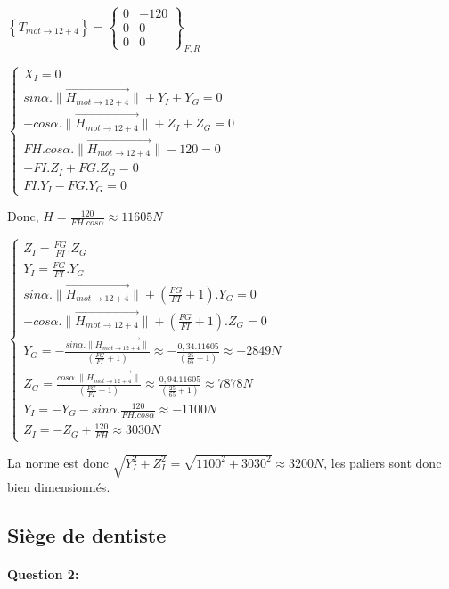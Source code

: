 $\left\{T_{mot\rightarrow 12+4}\right\}=\left\{
\begin{array}{cc}
0 & -120 \\
0 & 0 \\
0 & 0
\end{array}
\right\}_{F,R}$


$\left\{
\begin{array}{l}
X_I=0 \\
sin\alpha.\|\overrightarrow{H_{mot\rightarrow 12+4}}\|+Y_I+Y_G=0 \\
-cos\alpha.\|\overrightarrow{H_{mot\rightarrow 12+4}}\|+Z_I+Z_G=0 \\
FH.cos\alpha.\|\overrightarrow{H_{mot\rightarrow 12+4}}\|-120=0 \\
-FI.Z_I+FG.Z_G=0 \\
FI.Y_I-FG.Y_G=0
\end{array}
\right.$

Donc, $H=\frac{120}{FH.cos\alpha}\approx11605N$

$\left\{\begin{array}{l}
Z_I=\frac{FG}{FI}.Z_G \\
Y_I=\frac{FG}{FI}.Y_G \\
sin\alpha.\|\overrightarrow{H_{mot\rightarrow 12+4}}\|+(\frac{FG}{FI}+1).Y_G=0 \\
-cos\alpha.\|\overrightarrow{H_{mot\rightarrow 12+4}}\|+(\frac{FG}{FI}+1).Z_G=0 \\
Y_G=-\frac{sin\alpha.\|\overrightarrow{H_{mot\rightarrow 12+4}}\|}{(\frac{FG}{FI}+1)}\approx-\frac{0,34.11605}{(\frac{25}{65}+1)}\approx-2849N\\
Z_G=\frac{cos\alpha.\|\overrightarrow{H_{mot\rightarrow 12+4}}\|}{(\frac{FG}{FI}+1)}\approx\frac{0,94.11605}{(\frac{25}{65}+1)}\approx7878N\\
Y_I=-Y_G-sin\alpha.\frac{120}{FH.cos\alpha}\approx -1100N \\
Z_I=-Z_G+\frac{120}{FH}\approx 3030N
\end{array}\right.$

La norme est donc $\sqrt{Y_I^2+Z_I^2}=\sqrt{1100^2+3030^2}\approx 3200N$, les paliers sont donc bien dimensionnés.

\subsection{Siège de dentiste}

\paragraph{Question 2:}

